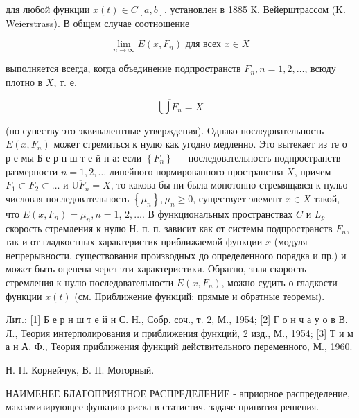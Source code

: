 \documentclass[10pt]{article}
\begin{document}
для любой функции $x(t) \in C[a, b]$, установлен в 1885 К. Вейерштрассом (K. Weierstrass). В общем случае соотношение



\[

\lim _{n \rightarrow \infty} E\left(x, F_{n}\right) \text { для всех } x \in X

\]



выполняется всегда, когда объединение подпространств $F_{n}, n=1,2, \ldots$, всюду плотно в $X$, т. е.



\[

\overline{\bigcup F_{n}}=X

\]



(по супеству это эквивалентные утверждения). Однако последовательность $E\left(x, F_{n}\right)$ может стремиться к нулю как угодно медленно. Это вытекает из те о р е мы Б е р н ш т е й н а: если $\left\{F_{n}\right\}-$ последовательность подпространств размерности $n=1,2, \ldots$ линейного нормированного пространства $X$, причем $F_{1} \subset F_{2} \subset \ldots$ и $\overline{\mathrm{U} F_{n}}=X$, то какова бы ни была монотонно стремящаяся к нульо числовая последовательность $\left\{\mu_{n}\right\}, \mu_{n} \geqslant 0$, существует элемент $x \in X$ такой, что $E\left(x, F_{n}\right)=\mu_{n}, n=1$, $2, \ldots$. В функциональных пространствах $C$ и $L_{p}$ скорость стремления к нулю Н. п. п. зависит как от системы подпространств $F_{n}$, так и от гладкостных характеристик приближаемой функции $x$ (модуля непрерывности, существования производных до определенного порядка и пр.) и может быть оценена через эти характеристики. Обратно, зная скорость стремления к нулю последовательности $E\left(x, F_{n}\right)$, можно судить о гладкости функции $x(t)$ (см. Приближение функций; прямые и обратные теоремы).



Лит.: [1] Б е р н ш т е й н С. Н., Собр. соч., т. 2, М., 1954; [2] Г о н ч а у о в В. Л., Теория интерполирования и приближения функций, 2 изд., М., 1954; [3] Т и м а н А. Ф., Теория приближения функций действительного переменного, М., 1960.

Н. П. Корнейчук, В. П. Моторный.



НАИМЕНЕЕ БЛАГОПРИЯТНОЕ РАСПРЕДЕЛЕНИЕ - априорное распределение, максимизирующее функцию риска в статистич. задаче принятия решения.
\end{document}
